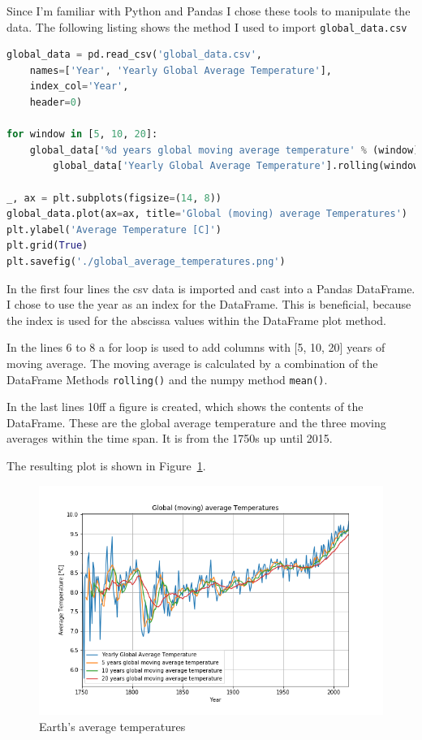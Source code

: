 \documentclass[DIV=11, a4paper, parskip=true]{scrartcl}
\begin{document}
Since I'm familiar with Python and Pandas I chose these tools to manipulate the data.
The following listing shows the method I used to import \texttt{global\_data.csv}

\begin{lstlisting}[language=Python, caption=Import the data from \texttt{global\_data}]
global_data = pd.read_csv('global_data.csv',
    names=['Year', 'Yearly Global Average Temperature'],
    index_col='Year',
    header=0)

for window in [5, 10, 20]:
    global_data['%d years global moving average temperature' % (window)] =\
        global_data['Yearly Global Average Temperature'].rolling(window=window).mean()

_, ax = plt.subplots(figsize=(14, 8))
global_data.plot(ax=ax, title='Global (moving) average Temperatures')
plt.ylabel('Average Temperature [C]')
plt.grid(True)
plt.savefig('./global_average_temperatures.png')
\end{lstlisting}

In the first four lines the csv data is imported and cast into a Pandas DataFrame. I chose to
use the year as an index for the DataFrame. This is beneficial, because the index is used for
the abscissa values within the DataFrame plot method.

In the lines 6 to 8 a for loop is used to add columns with [5, 10, 20] years of moving average.
The moving average is calculated by a combination of the DataFrame Methods \texttt{rolling()}
and the numpy method \texttt{mean()}.

In the last lines 10ff a figure is created, which shows the contents of the DataFrame. These
are the global average temperature and the three moving averages within the time span. It is
from the 1750s up until 2015.

The resulting plot is shown in Figure~\ref{global_averages}.

\begin{figure}[H]
    \centering
    \includegraphics[width=0.7\columnwidth]{global_average_temperatures.png}
    \caption{Earth's average temperatures}
    \label{global_averages}
\end{figure}
\end{document}

